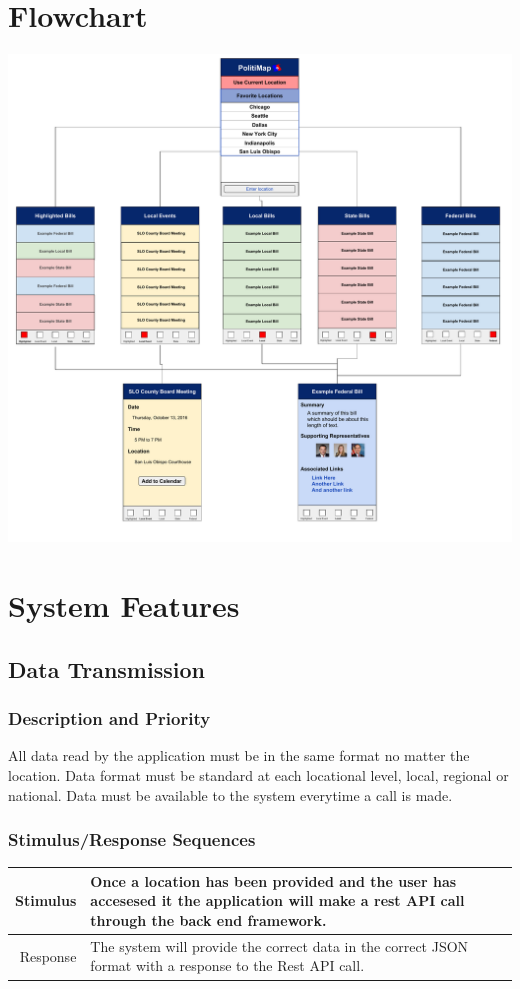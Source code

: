 \documentclass[12pt,oneside,letterpaper]{article}
\begin{document}
\section{Flowchart}
\includegraphics[width=\textwidth]{flowchart.pdf}

\section{System Features}

\subsection{Data Transmission}
\subsubsection{Description and Priority}
All data read by the application must be in the same format no matter the location. Data format must be standard at each locational level, local, regional or national. Data must be available to the system everytime a call is made.
\subsubsection{Stimulus/Response Sequences}
\begin{longtable}{|r|p{3.8in}|}
\hline
Stimulus & Once a location has been provided and the user has accesesed it the application will make a rest API call through the back end framework.\\
\hline
Response & The system will provide the correct data in the correct JSON format with a response to the Rest API call.\\
\hline
\end{longtable}
\end{document}
